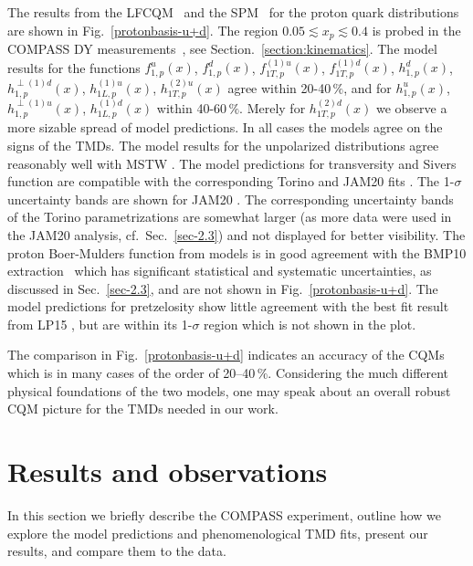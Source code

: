 \documentclass[a4paper]{article}
\begin{document}
The results from the LFCQM~\cite{Pasquini:2008ax,Boffi:2009sh,Pasquini:2011tk}  and the SPM~\cite{Gamberg:2007wm} for the proton quark distributions are 
shown in Fig.~\ref{protonbasis-u+d}. 
The region $0.05\lesssim x_p\lesssim0.4$
is probed in the COMPASS DY measurements~\cite{Aghasyan:2017jop}, see Section.~\ref{section:kinematics}. The model results for the functions
$f_{1,p}^u(x)$, $f_{1,p}^d(x)$, 
$f_{1T,p}^{(1)u}(x)$, $f_{1T,p}^{(1)d}(x)$, 
$h_{1,p}^d(x)$, $h_{1,p}^{\perp(1)d}(x)$, 
$h_{1L,p}^{(1)u}(x)$, $h_{1T,p}^{(2)u}(x)$
agree within 20-40$\,\%$, and for 
$h_{1,p}^u(x)$, 
$h_{1,p}^{\perp(1)u}(x)$, 
$h_{1L,p}^{(1)d}(x)$
within 40-60$\,\%$.
Merely for $h_{1T,p}^{(2)d}(x)$ we observe a more sizable 
spread of model predictions. 
In all cases the models agree on the signs of the TMDs.
The model results for the unpolarized distributions agree 
reasonably well with MSTW \cite{Martin:2009iq}. 
The model predictions for transversity and Sivers function are compatible 
with the corresponding Torino  \cite{Anselmino:2011gs,Anselmino:2013vqa} 
and JAM20 fits \cite{Cammarota:2020qcw}.
The 1-$\sigma$ uncertainty bands are shown for JAM20 \cite{Cammarota:2020qcw}.
The corresponding uncertainty bands of the Torino parametrizations
\cite{Anselmino:2011gs,Anselmino:2013vqa} are somewhat larger 
(as more data were used in the JAM20 analysis, cf.\ Sec.~\ref{sec-2.3})
and not displayed for better visibility. The proton Boer-Mulders 
function from models is in good agreement with the BMP10
extraction~\cite{Barone:2009hw} which has significant statistical and
systematic uncertainties, as discussed in Sec.~\ref{sec-2.3}, and 
are not shown in Fig.~\ref{protonbasis-u+d}. 
The model predictions for pretzelosity show little agreement with the 
best fit result from LP15 \cite{Lefky:2014eia}, but are within its
1-$\sigma$ region which is not shown in the plot.

The comparison in Fig.~\ref{protonbasis-u+d} indicates an accuracy 
of the CQMs which is in many cases of the order of  20--40$\,\%$.
Considering the much different physical foundations of the two models,
one may speak about an overall robust CQM picture for the TMDs
needed in our work.


\section{Results and observations}
\label{sec-3}

In this section we briefly describe the COMPASS experiment,
outline how we explore the model predictions and phenomenological 
TMD fits, present our results, and compare them to the data.
\end{document}
